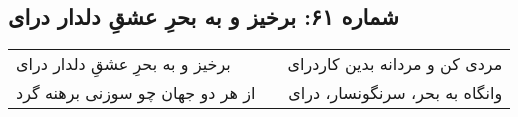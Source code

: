 \begin{center}
\section*{شماره ۶۱: برخیز و به بحرِ عشقِ دلدار درای}
\label{sec:061}
\begin{longtable}{l p{0.5cm} r}
برخیز و به بحرِ عشقِ دلدار درای
&&
مردی کن و مردانه بدین کاردرای
\\
از هر دو جهان چو سوزنی برهنه گرد
&&
وانگاه به بحر، سرنگونسار، درای
\\
\end{longtable}
\end{center}
